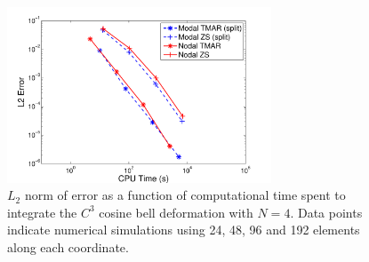 \documentclass{ametsoc}
\begin{document}
\begin{figure}[t]
\includegraphics[width=0.7\textwidth]{figs/2d/cosbellDef_L2Cpu.pdf}
\caption{$L_2$ norm of error as a function of computational time spent to integrate the $C^3$ cosine bell deformation with $N=4$. Data points indicate numerical simulations using 24, 48, 96 and 192 elements along each coordinate. }
\label{fig:L2cpu}
\end{figure}
\end{document}
